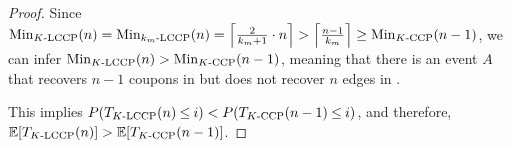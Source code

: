 \begin{proof}
Since $\Min{\fmecd{K}{P}{n}}{n} = \Min{\kecd{k_m}{n}}{n} = \left\lceil\frac{2}{k_m+1} \cdot n \right\rceil >
\left\lceil\frac{n-1}{k_m}\right\rceil \geq \Min{\ccpg{K}{n}}{n-1}$,
we can infer $\Min{\fmecd{K}{P}{n}}{n} > \Min{\ccpg{K}{n}}{n-1}$, 
meaning that there is an event $A$ that recovers $n-1$ coupons in  
but does not recover $n$ edges in .

This implies $P(\T{\fmecd{K}{P}{n}}{n}\hspace{-0.018cm} \leq \hspace{-0.018cm} i) < P(\T{\ccpg{K}{n}}{n-1} \hspace{-0.018cm} \leq \hspace{-0.018cm} i)$, and
therefore,
        $\E[\T{\fmecd{K}{P}{n}}{n}] >  \E[\T{\ccpg{K}{n}}{n-1}]$. 
\end{proof}


